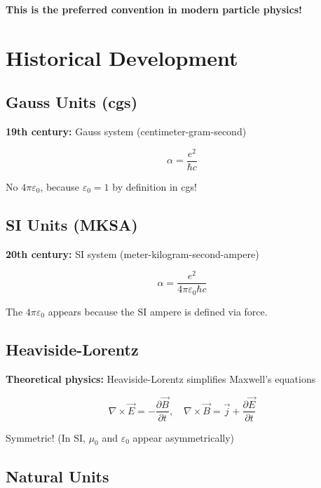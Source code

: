 	\textbf{This is the preferred convention in modern particle physics!}
	
	\section{Historical Development}
	
	\subsection{Gauss Units (cgs)}
	
	\textbf{19th century:} Gauss system (centimeter-gram-second)
	
	\begin{equation}
		\alpha = \frac{e^2}{\hbar c}
	\end{equation}
	
	No $4\pi\varepsilon_0$, because $\varepsilon_0 = 1$ by definition in cgs!
	
	\subsection{SI Units (MKSA)}
	
	\textbf{20th century:} SI system (meter-kilogram-second-ampere)
	
	\begin{equation}
		\alpha = \frac{e^2}{4\pi\varepsilon_0\hbar c}
	\end{equation}
	
	The $4\pi\varepsilon_0$ appears because the SI ampere is defined via force.
	
	\subsection{Heaviside-Lorentz}
	
	\textbf{Theoretical physics:} Heaviside-Lorentz simplifies Maxwell's equations
	
	\begin{equation}
		\nabla \times \vec{E} = -\frac{\partial \vec{B}}{\partial t}, \quad \nabla \times \vec{B} = \vec{j} + \frac{\partial \vec{E}}{\partial t}
	\end{equation}
	
	Symmetric! (In SI, $\mu_0$ and $\varepsilon_0$ appear asymmetrically)
	
	\subsection{Natural Units}
	
